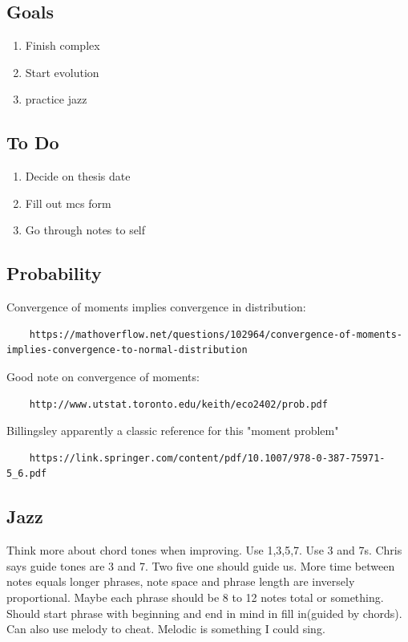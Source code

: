 \documentclass[11pt]{article}
\theoremstyle{remark}
\begin{document}
\subsection{Goals}

\begin{enumerate}
	\item Finish complex
	\item Start evolution
	\item practice jazz
\end{enumerate}

\subsection{To Do}

\begin{enumerate}
	\item Decide on thesis date
	\item Fill out mcs form
	\item Go through notes to self
\end{enumerate}

\subsection{Probability}

Convergence of moments implies convergence in distribution:

\begin{verbatim}
	https://mathoverflow.net/questions/102964/convergence-of-moments-implies-convergence-to-normal-distribution
\end{verbatim}

Good note on convergence of moments:

\begin{verbatim}
	http://www.utstat.toronto.edu/keith/eco2402/prob.pdf
\end{verbatim}

Billingsley apparently a classic reference for this "moment problem"

\begin{verbatim}
	https://link.springer.com/content/pdf/10.1007/978-0-387-75971-5_6.pdf
\end{verbatim}

\subsection{Jazz}

Think more about chord tones when improving. Use 1,3,5,7. Use 3 and 7s. Chris says guide tones are 3 and 7. Two five one should guide us. More time between notes equals longer phrases, note space and phrase length are inversely proportional. Maybe each phrase should be 8 to 12 notes total or something. Should start phrase with beginning and end in mind in fill in(guided by chords). Can also use melody to cheat. Melodic is something I could sing. 
\end{document}
